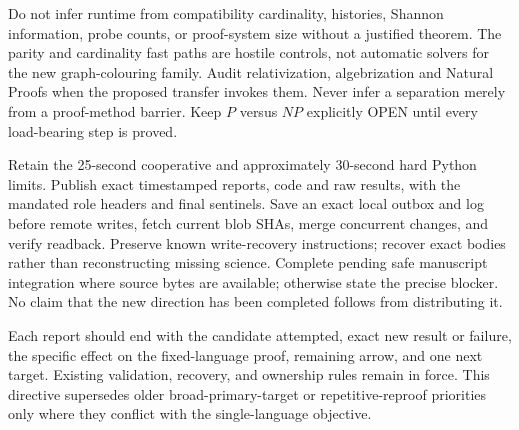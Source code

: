 \documentclass[11pt]{article}
\begin{document}
Do not infer runtime from compatibility cardinality, histories, Shannon information, probe counts, or proof-system size without a justified theorem. The parity and cardinality fast paths are hostile controls, not automatic solvers for the new graph-colouring family. Audit relativization, algebrization and Natural Proofs when the proposed transfer invokes them. Never infer a separation merely from a proof-method barrier. Keep $P$ versus $NP$ explicitly OPEN until every load-bearing step is proved.

Retain the 25-second cooperative and approximately 30-second hard Python limits. Publish exact timestamped reports, code and raw results, with the mandated role headers and final sentinels. Save an exact local outbox and log before remote writes, fetch current blob SHAs, merge concurrent changes, and verify readback. Preserve known write-recovery instructions; recover exact bodies rather than reconstructing missing science. Complete pending safe manuscript integration where source bytes are available; otherwise state the precise blocker. No claim that the new direction has been completed follows from distributing it.

Each report should end with the candidate attempted, exact new result or failure, the specific effect on the fixed-language proof, remaining arrow, and one next target. Existing validation, recovery, and ownership rules remain in force. This directive supersedes older broad-primary-target or repetitive-reproof priorities only where they conflict with the single-language objective.
\end{document}
